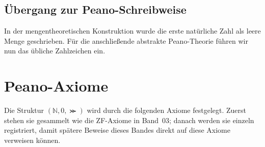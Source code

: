 \documentclass[main.tex]{subfiles}
\begin{document}

\section{Übergang zur Peano-Schreibweise}

In der mengentheoretischen Konstruktion wurde die erste natürliche Zahl als
leere Menge geschrieben. Für die anschließende abstrakte Peano-Theorie führen
wir nun das übliche Zahlzeichen ein.

\FormulaDefAuto[Nullzeichen]{0\coloneqq\varnothing}

\chapter{Peano-Axiome}

Die Struktur \((\mathbb{N},0,\Succ)\) wird durch die folgenden Axiome
festgelegt. Zuerst stehen sie gesammelt wie die ZF-Axiome in Band~03; danach
werden sie einzeln registriert, damit spätere Beweise dieses Bandes direkt
auf diese Axiome verweisen können.
\end{document}

